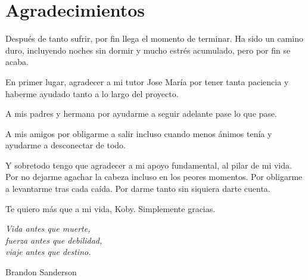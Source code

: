 \cleardoublepage

\chapter*{Agradecimientos}

Después de tanto sufrir, por fin llega el momento de terminar. Ha sido un camino duro, incluyendo noches sin dormir y mucho estrés acumulado,
pero por fin se acaba.

  \vspace{3mm}

En primer lugar, agradecer a mi tutor Jose María por tener tanta paciencia y haberme ayudado tanto a lo largo del proyecto.

  \vspace{3mm}

A mis padres y hermana por ayudarme a seguir adelante pase lo que pase.

  \vspace{3mm}

A mis amigos por obligarme a salir incluso cuando menos ánimos tenía y ayudarme a desconectar de todo.

  \vspace{3mm}

Y sobretodo tengo que agradecer a mi apoyo fundamental, al pilar de mi vida.
Por no dejarme agachar la cabeza incluso en los peores momentos.
Por obligarme a levantarme tras cada caída.
Por darme tanto sin siquiera darte cuenta.

Te quiero más que a mi vida, Koby.
Simplemente gracias.


\begin{flushright}
  \vspace{4.0 cm}
  \emph{Vida antes que muerte,\\
    fuerza antes que debilidad,\\
    viaje antes que destino.}\\
  \par
  
  \vspace{5mm}
  Brandon Sanderson\\
\end{flushright}


\thispagestyle{empty}

